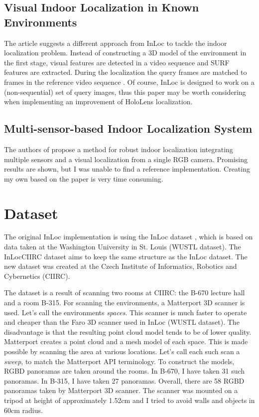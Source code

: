 \documentclass[twoside]{ctuthesis}
\theoremstyle{plain}
\theoremstyle{definition}
\theoremstyle{note}
\begin{document}
\section{Visual Indoor Localization in Known Environments}
The article \cite{VisualIndoorLocalizationInKnownEnvironments} suggests a different approach from InLoc to tackle the indoor localization problem. Instead of constructing a 3D model of the environment in the first stage, visual features are detected in a video sequence and SURF features \cite{SURF} are extracted. During the localization the query frames are matched to frames in the reference video sequence \cite{VisualIndoorLocalizationInKnownEnvironments}. Of course, InLoc is designed to work on a (non-sequential) set of query images, thus this paper may be worth considering when implementing an improvement of HoloLens localization.

\section{Multi-sensor-based Indoor Localization System}
The authors of \cite{MutliSensorLocalization} propose a method for robust indoor localization integrating multiple sensors and a visual localization from a single RGB camera. Promising results are shown, but I was unable to find a reference implementation. Creating my own based on the paper is very time consuming.

\chapter{Dataset}
\label{chapter:dataset}
The original InLoc implementation is using the InLoc dataset \cite{taira2018inloc}, which is based on data taken at the Washington University in St. Louis (WUSTL dataset). The InLocCIIRC dataset aims to keep the same structure as the InLoc dataset. The new dataset was created at the Czech Institute of Informatics, Robotics and Cybernetics (CIIRC).

The dataset is a result of scanning two rooms at CIIRC: the B-670 lecture hall and a room B-315. For scanning the environments, a Matterport 3D scanner is used. Let's call the environments \emph{spaces}. This scanner is much faster to operate and cheaper than the Faro 3D scanner used in InLoc (WUSTL dataset). The disadvantage is that the resulting point cloud model tends to be of lower quality. Matterport creates a point cloud and a mesh model of each space. This is made possible by scanning the area at various locations. Let's call each such scan a \emph{sweep}, to match the Matterport API terminology. To construct the models, RGBD panoramas are taken around the rooms. In B-670, I have taken 31 such panoramas. In B-315, I have taken 27 panoramas. Overall, there are 58 RGBD panoramas taken by Matterport 3D scanner. The scanner was mounted on a tripod at height of approximately 1.52cm and I tried to avoid walls and objects in 60cm radius.
\end{document}
